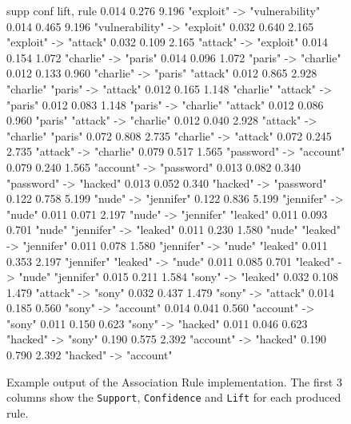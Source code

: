 \documentclass[12pt]{article}
\begin{document}
\begin{figure}[h!]
\begin{footnotesize}
\begin{spverbatim}

 supp    conf    lift,  rule
0.014   0.276   9.196   "exploit" -> "vulnerability"
0.014   0.465   9.196   "vulnerability" -> "exploit"
0.032   0.640   2.165   "exploit" -> "attack"
0.032   0.109   2.165   "attack" -> "exploit"
0.014   0.154   1.072   "charlie" -> "paris"
0.014   0.096   1.072   "paris" -> "charlie"
0.012   0.133   0.960   "charlie" -> "paris" "attack"
0.012   0.865   2.928   "charlie" "paris" -> "attack"
0.012   0.165   1.148   "charlie" "attack" -> "paris"
0.012   0.083   1.148   "paris" -> "charlie" "attack"
0.012   0.086   0.960   "paris" "attack" -> "charlie"
0.012   0.040   2.928   "attack" -> "charlie" "paris"
0.072   0.808   2.735   "charlie" -> "attack"
0.072   0.245   2.735   "attack" -> "charlie"
0.079   0.517   1.565   "password" -> "account"
0.079   0.240   1.565   "account" -> "password"
0.013   0.082   0.340   "password" -> "hacked"
0.013   0.052   0.340   "hacked" -> "password"
0.122   0.758   5.199   "nude" -> "jennifer"
0.122   0.836   5.199   "jennifer" -> "nude"
0.011   0.071   2.197   "nude" -> "jennifer" "leaked"
0.011   0.093   0.701   "nude" "jennifer" -> "leaked"
0.011   0.230   1.580   "nude" "leaked" -> "jennifer"
0.011   0.078   1.580   "jennifer" -> "nude" "leaked"
0.011   0.353   2.197   "jennifer" "leaked" -> "nude"
0.011   0.085   0.701   "leaked" -> "nude" "jennifer"
0.015   0.211   1.584   "sony" -> "leaked"
0.032   0.108   1.479   "attack" -> "sony"
0.032   0.437   1.479   "sony" -> "attack"
0.014   0.185   0.560   "sony" -> "account"
0.014   0.041   0.560   "account" -> "sony"
0.011   0.150   0.623   "sony" -> "hacked"
0.011   0.046   0.623   "hacked" -> "sony"
0.190   0.575   2.392   "account" -> "hacked"
0.190   0.790   2.392   "hacked" -> "account"
\end{spverbatim}
\end{footnotesize}
\captionsetup{font=small}
\caption{Example output of the Association Rule implementation. The first 3 columns show the \texttt{Support}, \texttt{Confidence} and \texttt{Lift} for each produced rule.}
\label{fig:assoc}
\end{figure}
\newpage
\end{document}
